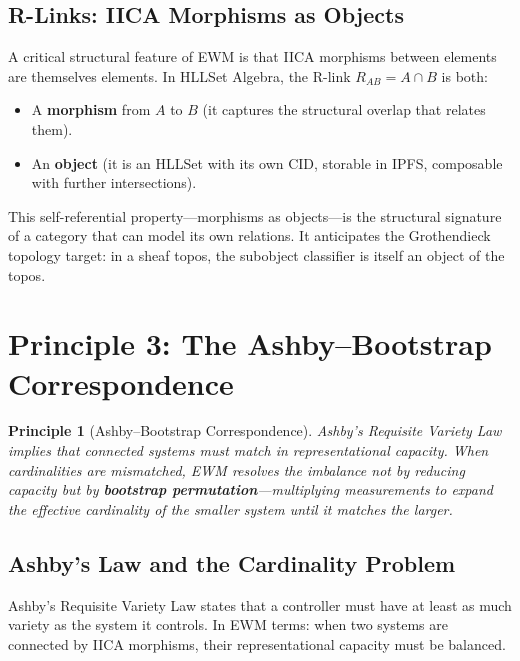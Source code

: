 \documentclass[11pt,a4paper]{article}
\newtheorem{principle}{Principle}[section]
\theoremstyle{remark}
\begin{document}
\subsection{R-Links: IICA Morphisms as Objects}

A critical structural feature of EWM is that IICA morphisms between elements are
themselves elements. In HLLSet Algebra, the R-link $R_{AB} = A \cap B$ is both:
\begin{itemize}[leftmargin=*,nosep]
  \item A \textbf{morphism} from $A$ to $B$ (it captures the structural overlap that
    relates them).
  \item An \textbf{object} (it is an HLLSet with its own CID, storable in IPFS,
    composable with further intersections).
\end{itemize}

This self-referential property---morphisms as objects---is the structural signature of
a category that can model its own relations. It anticipates the Grothendieck topology
target: in a sheaf topos, the subobject classifier is itself an object of the topos.

\section{Principle 3: The Ashby--Bootstrap Correspondence}
\label{sec:ashby}

\begin{principle}[Ashby--Bootstrap Correspondence]
\label{prin:ashby}
Ashby's Requisite Variety Law implies that connected systems must match in
representational capacity. When cardinalities are mismatched, EWM resolves the
imbalance not by reducing capacity but by \textbf{bootstrap permutation}---multiplying
measurements to expand the effective cardinality of the smaller system until it
matches the larger.
\end{principle}

\subsection{Ashby's Law and the Cardinality Problem}

Ashby's Requisite Variety Law \cite{ashby1952} states that a controller must have at
least as much variety as the system it controls. In EWM terms: when two systems are
connected by IICA morphisms, their representational capacity must be balanced.
\end{document}
